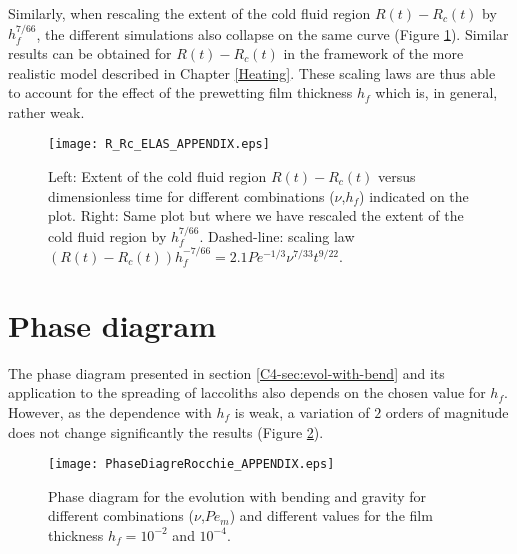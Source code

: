 Similarly,  when  rescaling  the  extent  of  the  cold  fluid  region
$R(t)-R_c(t)$ by $h_f^{7/66}$, the different simulations also collapse
on the same curve  (Figure \ref{R_Rc_ELAS_APPENDIX}).  Similar results
can  be  obtained for  $R(t)-R_c(t)$  in  the  framework of  the  more
realistic model described in Chapter \ref{Heating}. These scaling laws
are  thus able  to  account  for the  effect  of  the prewetting  film
thickness $h_f$ which is, in general, rather weak.

\begin{figure}[h!]
  \begin{center}
    \graphicspath{ {/Users/thorey/Documents/These/Projet/Refroidissement/Skin_Model/Figure/JFM_V13/} }
    \texttt{[image: R\_Rc\_ELAS\_APPENDIX.eps]}
    \caption{Left:  Extent  of  the cold  fluid  region  $R(t)-R_c(t)$
      versus   dimensionless    time   for    different   combinations
      ($\nu$,$h_f$) indicated on the plot.  Right: Same plot but where
      we  have  rescaled  the  extent  of the  cold  fluid  region  by
      $h_f^{7/66}$.          Dashed-line:          scaling         law
      $(R(t)-R_c(t))h_f^{-7/66}= 2.1 Pe^{-1/3}\nu^{7/33}t^{9/22}$.}
    \label{R_Rc_ELAS_APPENDIX}
  \end{center}
\end{figure}

\section{Phase diagram}
\label{sec:phase-diagram}


The phase diagram presented in section \ref{C4-sec:evol-with-bend} and
its application  to the  spreading of laccoliths  also depends  on the
chosen value for $h_f$. However, as the dependence with $h_f$ is weak,
a variation of  $2$ orders of magnitude does  not change significantly
the results (Figure \ref{C3-PhaseDiagramJFM_Appendix}).

\begin{figure}[h!]
  \begin{center}
    \graphicspath{ {/Users/thorey/Documents/These/Projet/Refroidissement/Skin_Model/Figure/Figure_Heating/} }
    \texttt{[image: PhaseDiagreRocchie\_APPENDIX.eps]}
    \caption{Phase diagram for the  evolution with bending and gravity
      for different  combinations ($\nu$,$Pe_m$) and  different values
      for the film thickness $h_f = 10^{-2}$ and $10^{-4}$.}
    \label{C3-PhaseDiagramJFM_Appendix}
  \end{center}
\end{figure}

